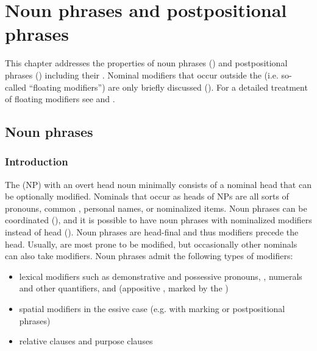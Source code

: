 \chapter{Noun phrases and postpositional phrases}\label{cpt:Phrase structure}

This chapter addresses the properties of noun phrases () and postpositional phrases () including their . Nominal modifiers that occur outside the  (i.e. so-called ``floating modifiers'') are only briefly discussed (). For a detailed treatment of floating modifiers see  and .


\section{Noun phrases}\label{sec:Noun phrases}
\largerpage


\subsection{Introduction}
\label{ssec:IntroductionNP}

The  (NP) with an overt head noun minimally consists of a nominal head that can be optionally modified. Nominals that occur as heads of NPs are all sorts of pronouns, common , personal names, or nominalized items. Noun phrases can be coordinated (), and it is possible to have noun phrases with nominalized modifiers instead of head  (). Noun phrases are head-final and thus modifiers precede the head. Usually,  are most prone to be modified, but occasionally other nominals can also take modifiers. Noun phrases admit the following types of modifiers:

\begin{itemize}
	\item	lexical modifiers such as demonstrative and possessive pronouns, , numerals and other quantifiers, and  (appositive ,  marked by the )
	\item	spatial modifiers in the essive case (e.g.  with  marking or postpositional phrases)
	\item	{}relative clauses and purpose clauses
\end{itemize}
%

